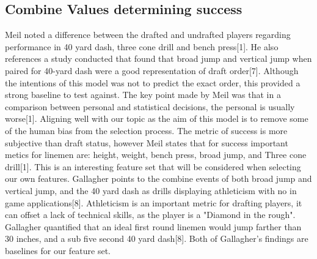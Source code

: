 \documentclass[confrence]{IEEEtran}
\begin{document}
\subsection*{Combine Values determining success}
Meil noted a difference between the drafted and undrafted players regarding performance in 40 yard dash, three cone drill and bench press[1].
He also references a study conducted that found that broad jump and vertical jump when paired for 40-yard dash were a good representation of draft order[7].
Although the intentions of this model was not to predict the exact order, this provided a strong baseline to test against.
The key point made by Meil was that in a comparison between personal and statistical decisions, the personal is usually worse[1].
Aligning well with our topic as the aim of this model is to remove some of the human bias from the selection process.
The metric of success is more subjective than draft status, however Meil states that for success important metics for linemen are: height, weight, bench press, broad jump, and Three cone drill[1].
This is an interesting feature set that will be considered when selecting our own features.
Gallagher points to the combine events of both broad jump and vertical jump, and the 40 yard dash as drills displaying athleticism with no in game applications[8].
Athleticism is an important metric for drafting players, it can offset a lack of technical skills, as the player is a "Diamond in the rough".
Gallagher quantified that an ideal first round linemen would jump farther than 30 inches, and a sub five second 40 yard dash[8].
Both of Gallagher's findings are baselines for our feature set.
\end{document}
